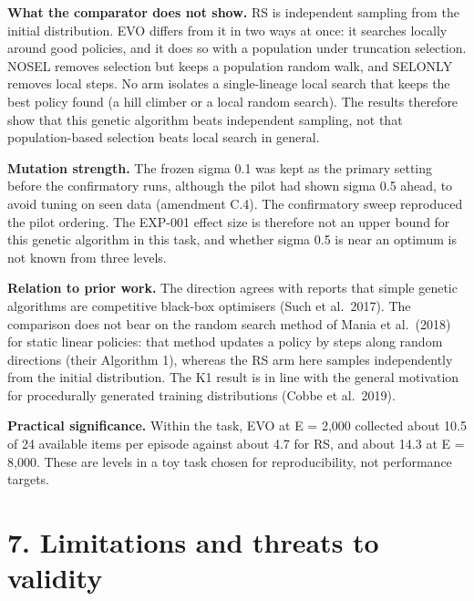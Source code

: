 \documentclass[
]{article}
\begin{document}
\textbf{What the comparator does not show.} RS is independent sampling
from the initial distribution. EVO differs from it in two ways at once:
it searches locally around good policies, and it does so with a
population under truncation selection. NOSEL removes selection but keeps
a population random walk, and SELONLY removes local steps. No arm
isolates a single-lineage local search that keeps the best policy found
(a hill climber or a local random search). The results therefore show
that this genetic algorithm beats independent sampling, not that
population-based selection beats local search in general.

\textbf{Mutation strength.} The frozen sigma 0.1 was kept as the primary
setting before the confirmatory runs, although the pilot had shown sigma
0.5 ahead, to avoid tuning on seen data (amendment C.4). The
confirmatory sweep reproduced the pilot ordering. The EXP-001 effect
size is therefore not an upper bound for this genetic algorithm in this
task, and whether sigma 0.5 is near an optimum is not known from three
levels.

\textbf{Relation to prior work.} The direction agrees with reports that
simple genetic algorithms are competitive black-box optimisers (Such et
al.~2017). The comparison does not bear on the random search method of
Mania et al.~(2018) for static linear policies: that method updates a
policy by steps along random directions (their Algorithm 1), whereas the
RS arm here samples independently from the initial distribution. The K1
result is in line with the general motivation for procedurally generated
training distributions (Cobbe et al.~2019).

\textbf{Practical significance.} Within the task, EVO at E = 2,000
collected about 10.5 of 24 available items per episode against about 4.7
for RS, and about 14.3 at E = 8,000. These are levels in a toy task
chosen for reproducibility, not performance targets.

\section{7. Limitations and threats to
validity}\label{limitations-and-threats-to-validity}
\end{document}
